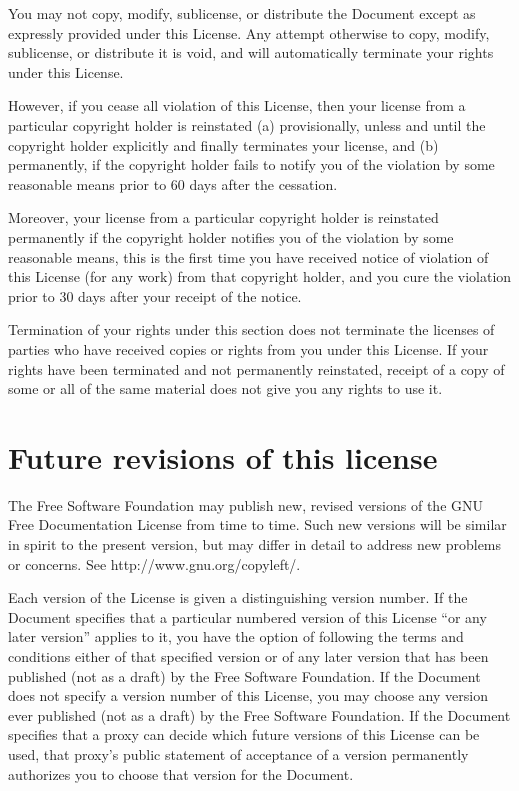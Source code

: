 You may not copy, modify, sublicense, or distribute the Document
except as expressly provided under this License.  Any attempt
otherwise to copy, modify, sublicense, or distribute it is void, and
will automatically terminate your rights under this License.

However, if you cease all violation of this License, then your license
from a particular copyright holder is reinstated (a) provisionally,
unless and until the copyright holder explicitly and finally
terminates your license, and (b) permanently, if the copyright holder
fails to notify you of the violation by some reasonable means prior to
60 days after the cessation.

Moreover, your license from a particular copyright holder is
reinstated permanently if the copyright holder notifies you of the
violation by some reasonable means, this is the first time you have
received notice of violation of this License (for any work) from that
copyright holder, and you cure the violation prior to 30 days after
your receipt of the notice.

Termination of your rights under this section does not terminate the
licenses of parties who have received copies or rights from you under
this License.  If your rights have been terminated and not permanently
reinstated, receipt of a copy of some or all of the same material does
not give you any rights to use it.


\section{Future revisions of this license}

The Free Software Foundation may publish new, revised versions
of the GNU Free Documentation License from time to time.  Such new
versions will be similar in spirit to the present version, but may
differ in detail to address new problems or concerns.  See
http://www.gnu.org/copyleft/.

Each version of the License is given a distinguishing version number.
If the Document specifies that a particular numbered version of this
License ``or any later version'' applies to it, you have the option of
following the terms and conditions either of that specified version or
of any later version that has been published (not as a draft) by the
Free Software Foundation.  If the Document does not specify a version
number of this License, you may choose any version ever published (not
as a draft) by the Free Software Foundation.  If the Document
specifies that a proxy can decide which future versions of this
License can be used, that proxy's public statement of acceptance of a
version permanently authorizes you to choose that version for the
Document.


